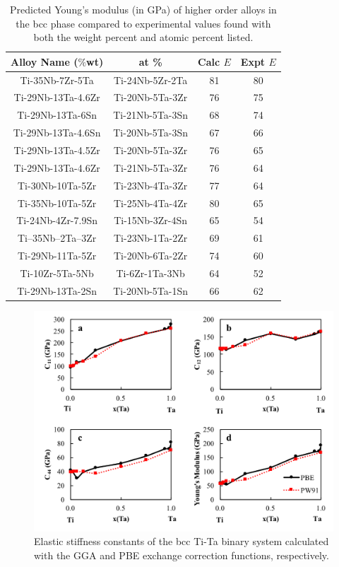 \newpage
\begin{table}[H]
	\caption{Predicted Young's modulus (in GPa) of higher order alloys in the bcc phase compared to experimental values found with both the weight percent and atomic percent listed.}
	\centering
	\begin{tabular}{ c c c c }
		\hline
		Alloy Name ($\%$wt) & at \% & Calc $E$ & Expt $E$\\
		\hline
		Ti-35Nb-7Zr-5Ta \cite{Geetha2009} & Ti-24Nb-5Zr-2Ta & 81 & 80\\
		Ti-29Nb-13Ta-4.6Zr \cite{Geetha2009}  & Ti-20Nb-5Ta-3Zr & 76 & 75\\
		Ti-29Nb-13Ta-6Sn \cite{Geetha2009} & Ti-21Nb-5Ta-3Sn & 68 & 74\\
		Ti-29Nb-13Ta-4.6Sn \cite{Geetha2009} & Ti-20Nb-5Ta-3Sn & 67 & 66\\
		Ti-29Nb-13Ta-4.5Zr \cite{Geetha2009} & Ti-20Nb-5Ta-3Zr & 76 & 65\\
		Ti-29Nb-13Ta-4.6Zr \cite{Tane2010a} & Ti-21Nb-5Ta-3Zr & 76 & 64\\
		Ti-30Nb-10Ta-5Zr \cite{Tane2010a} & Ti-23Nb-4Ta-3Zr & 77 & 64\\
		Ti-35Nb-10Ta-5Zr \cite{Tane2010a} & Ti-25Nb-4Ta-4Zr & 80 & 65\\
		Ti-24Nb-4Zr-7.9Sn \cite{Mohammed2014} & Ti-15Nb-3Zr-4Sn & 65 & 54\\
		Ti–35Nb–2Ta–3Zr \cite{Mohammed2014} & Ti-23Nb-1Ta-2Zr & 69 & 61\\
		Ti-29Nb-11Ta-5Zr \cite{Mohammed2014} & Ti-20Nb-6Ta-2Zr & 74 & 60\\
		Ti-10Zr-5Ta-5Nb \cite{Mohammed2014} & Ti-6Zr-1Ta-3Nb & 64 & 52\\
		Ti-29Nb-13Ta-2Sn \cite{Mohammed2014} & Ti-20Nb-5Ta-1Sn & 66 & 62\\
		\hline
	\end{tabular}
	\label{Ch5-table:tixdatacomp}
\end{table}
\clearpage

\pagebreak
\begin{figure}[H]
	\centering
	\includegraphics[width=\textwidth]{Chapter-5/Figures/PBEvsPW91.png}
	\caption{Elastic stiffness constants of the bcc Ti-Ta binary system calculated with the GGA and PBE exchange correction functions, respectively.}
	\label{Ch5-figure:PBEvsPW91}
\end{figure}

